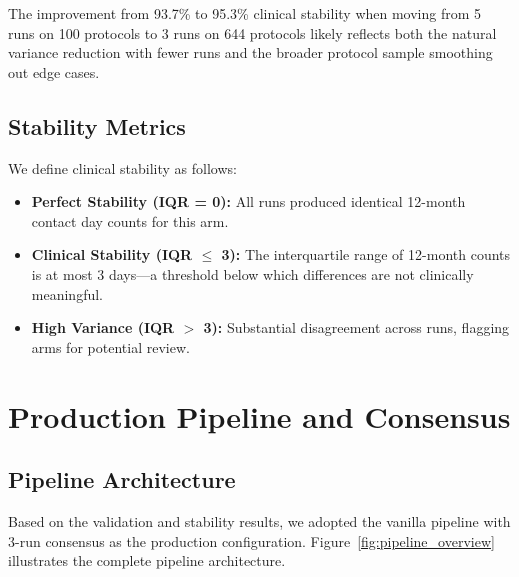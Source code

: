 \documentclass[11pt]{article}
\begin{document}
The improvement from 93.7\% to 95.3\% clinical stability when moving from 5 runs on 100 protocols to 3 runs on 644 protocols likely reflects both the natural variance reduction with fewer runs and the broader protocol sample smoothing out edge cases.

\subsection{Stability Metrics}

We define clinical stability as follows:
\begin{itemize}[leftmargin=*]
    \item \textbf{Perfect Stability (IQR = 0):} All runs produced identical 12-month contact day counts for this arm.
    \item \textbf{Clinical Stability (IQR $\leq$ 3):} The interquartile range of 12-month counts is at most 3 days---a threshold below which differences are not clinically meaningful.
    \item \textbf{High Variance (IQR $>$ 3):} Substantial disagreement across runs, flagging arms for potential review.
\end{itemize}

\section{Production Pipeline and Consensus}

\subsection{Pipeline Architecture}

Based on the validation and stability results, we adopted the vanilla pipeline with 3-run consensus as the production configuration. Figure~\ref{fig:pipeline_overview} illustrates the complete pipeline architecture.
\end{document}
